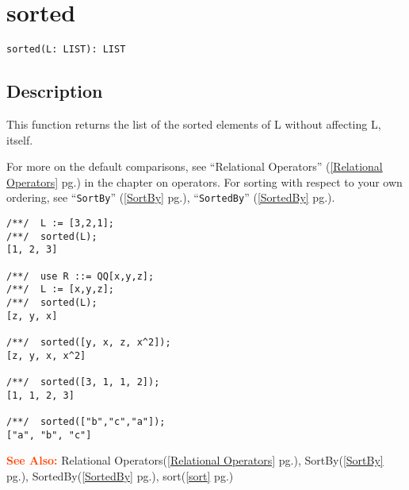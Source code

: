 \documentclass[a4paper]{mybook}
\newenvironment{command}{}{} %
\newcommand\SeeAlso{\par\textcolor{OrangeRed}{\textbf{\large See Also: }}}
\begin{document}
\section{sorted}
\label{sorted}
\begin{command} %


\begin{Verbatim}[label=syntax, rulecolor=\color{MidnightBlue},
frame=single]
sorted(L: LIST): LIST
\end{Verbatim}


\subsection*{Description}

This function returns the list of the sorted elements of L without
affecting L, itself.
\par 
For more on the default comparisons, see ``Relational Operators'' (\ref{Relational Operators} pg.\pageref{Relational Operators})
in the chapter on operators.
For sorting with respect to your own ordering, see ``\verb&SortBy&'' (\ref{SortBy} pg.\pageref{SortBy}), ``\verb&SortedBy&'' (\ref{SortedBy} pg.\pageref{SortedBy}).
\begin{Verbatim}[label=example, rulecolor=\color{PineGreen}, frame=single]
/**/  L := [3,2,1];
/**/  sorted(L);
[1, 2, 3]

/**/  use R ::= QQ[x,y,z];
/**/  L := [x,y,z];
/**/  sorted(L);
[z, y, x]

/**/  sorted([y, x, z, x^2]);
[z, y, x, x^2]

/**/  sorted([3, 1, 1, 2]);
[1, 1, 2, 3]

/**/  sorted(["b","c","a"]);
["a", "b", "c"]
\end{Verbatim}


\SeeAlso %
  Relational Operators(\ref{Relational Operators} pg.\pageref{Relational Operators}), 
    SortBy(\ref{SortBy} pg.\pageref{SortBy}), 
    SortedBy(\ref{SortedBy} pg.\pageref{SortedBy}), 
    sort(\ref{sort} pg.\pageref{sort})
\end{command} %
\end{document}
